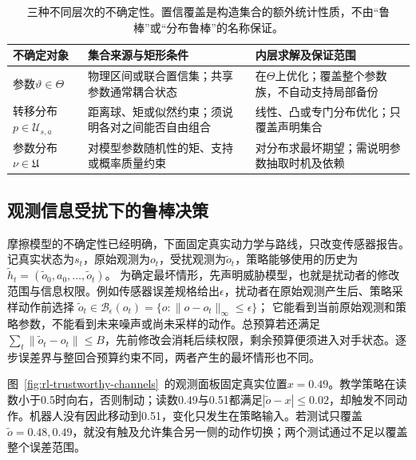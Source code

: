 \begin{table}[htbp]
  \centering
  \begin{tabularx}{\linewidth}{@{}>{\raggedright\arraybackslash}p{20mm}XX@{}}
    \toprule
    不确定对象 & 集合来源与矩形条件 & 内层求解及保证范围 \\
    \midrule
    参数$\vartheta\in\Theta$ & 物理区间或联合置信集；共享参数通常耦合状态 & 在$\Theta$上优化；覆盖整个参数族，不自动支持局部备份 \\
    转移分布$p\in\mathcal U_{s,a}$ & 距离球、矩或似然约束；须说明各对之间能否自由组合 & 线性、凸或专门分布优化；只覆盖声明集合 \\
    参数分布$\nu\in\mathfrak U$ & 对模型参数随机性的矩、支持或概率质量约束 & 对分布求最坏期望；需说明参数抽取时机及依赖 \\
    \bottomrule
  \end{tabularx}
  \caption{三种不同层次的不确定性。置信覆盖是构造集合的额外统计性质，不由“鲁棒”或“分布鲁棒”的名称保证。}
  \label{tab:rl-trustworthy-uncertainty}
\end{table}

\subsection{观测信息受扰下的鲁棒决策}
\label{sec:rl-trustworthy-observation}

摩擦模型的不确定性已经明确，下面固定真实动力学与路线，只改变传感器报告。记真实状态为$s_t$，原始观测为$o_t$，受扰观测为$\widetilde o_t$，策略能够使用的历史为
$\widetilde h_t=(\widetilde o_0,a_0,\ldots,\widetilde o_t)$。
为确定最坏情形，先声明威胁模型，也就是扰动者的修改范围与信息权限。例如传感器误差规格给出$\epsilon$，扰动者在原始观测产生后、策略采样动作前选择
$\widetilde o_t\in\mathcal B_\epsilon(o_t)=\{o:\lVert o-o_t\rVert_\infty\leq\epsilon\}$；
它能看到当前原始观测和策略参数，不能看到未来噪声或尚未采样的动作。总预算若还满足$\sum_t\lVert\widetilde o_t-o_t\rVert\leq B$，先前修改会消耗后续权限，剩余预算便须进入对手状态。逐步误差界与整回合预算约束不同，两者产生的最坏情形也不同。

图~\ref{fig:rl-trustworthy-channels}~的观测面板固定真实位置$x=0.49$。教学策略在读数小于0.5时向右，否则制动；读数0.49与0.51都满足$|\widetilde o-x|\leq0.02$，却触发不同动作。机器人没有因此移动到0.51，变化只发生在策略输入。若测试只覆盖$\widetilde o=0.48,0.49$，就没有触及允许集合另一侧的动作切换；两个测试通过不足以覆盖整个误差范围。

